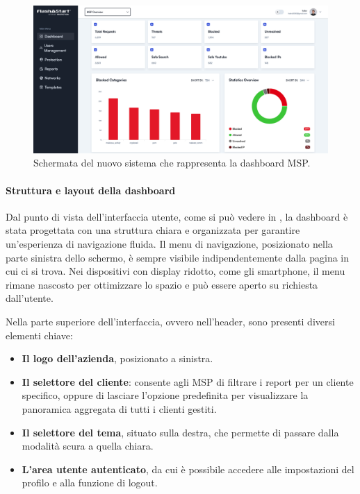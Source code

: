 \begin{figure}
  \centering
  \includegraphics[width=1\textwidth]{figures/new-dashboard.png}
  \caption{Schermata del nuovo sistema che rappresenta la dashboard MSP.}
  \label{fig:dashboard-msp}
\end{figure}

\paragraph{Struttura e layout della dashboard}
Dal punto di vista dell’interfaccia utente, come si può vedere in , la dashboard è stata progettata con una struttura chiara e organizzata per garantire un’esperienza di navigazione fluida. Il menu di navigazione, posizionato nella parte sinistra dello schermo, è sempre visibile indipendentemente dalla pagina in cui ci si trova. Nei dispositivi con display ridotto, come gli smartphone, il menu rimane nascosto per ottimizzare lo spazio e può essere aperto su richiesta dall’utente.

Nella parte superiore dell’interfaccia, ovvero nell’header, sono presenti diversi elementi chiave:
\begin{itemize}
  \item \textbf{Il logo dell'azienda}, posizionato a sinistra.
  \item \textbf{Il selettore del cliente}: consente agli MSP di filtrare i report per un cliente specifico, oppure di lasciare l’opzione predefinita per visualizzare la panoramica aggregata di tutti i clienti gestiti.
  \item \textbf{Il selettore del tema}, situato sulla destra, che permette di passare dalla modalità scura a quella chiara.
  \item \textbf{L’area utente autenticato}, da cui è possibile accedere alle impostazioni del profilo e alla funzione di logout.
\end{itemize}

